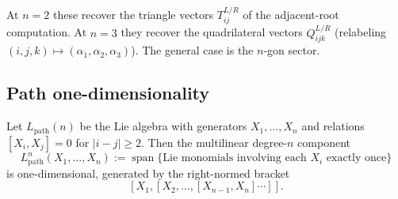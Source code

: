 \begin{remark}
At $n=2$ these recover the triangle vectors $T_{ij}^{L/R}$ of the
adjacent-root computation. At $n=3$ they recover the quadrilateral
vectors $Q_{ijk}^{L/R}$ (relabeling
$(i,j,k)\mapsto(\alpha_1,\alpha_2,\alpha_3)$). The general case is the
$n$-gon sector.
\end{remark}

\subsection{Path one-dimensionality}

\begin{theorem}
\label{thm:path-one-dim}
Let $L_{\mathrm{path}}(n)$ be the Lie algebra with generators
$X_1,\ldots,X_n$ and relations $[X_i,X_j]=0$ for $|i-j|\ge 2$. Then
the multilinear degree-$n$ component
\[
L_{\mathrm{path}}^n(X_1,\ldots,X_n)
:=
\operatorname{span}\{\text{Lie monomials involving each }X_i\text{ exactly
once}\}
\]
is one-dimensional, generated by the right-normed bracket
\[
[X_1,[X_2,\ldots,[X_{n-1},X_n]\cdots]].
\]
\end{theorem}

